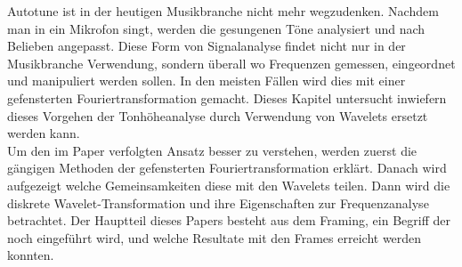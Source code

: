 Autotune ist in der heutigen Musikbranche nicht mehr wegzudenken. Nachdem man in ein Mikrofon singt, werden die gesungenen Töne analysiert und nach Belieben angepasst. Diese Form von Signalanalyse findet nicht nur in der Musikbranche Verwendung, sondern überall wo Frequenzen gemessen, eingeordnet und manipuliert werden sollen. In den meisten Fällen wird dies mit einer gefensterten Fouriertransformation gemacht. Dieses Kapitel untersucht inwiefern dieses Vorgehen der Tonhöheanalyse durch Verwendung von Wavelets ersetzt werden kann.\\

Um den im Paper verfolgten Ansatz besser zu verstehen, werden zuerst die gängigen Methoden der gefensterten Fouriertransformation erklärt. Danach wird aufgezeigt welche Gemeinsamkeiten diese mit den Wavelets teilen. Dann wird die diskrete Wavelet-Transformation und ihre Eigenschaften zur Frequenzanalyse betrachtet. Der Hauptteil dieses Papers besteht aus dem Framing, ein Begriff der noch eingeführt wird, und welche Resultate mit den Frames erreicht werden konnten. 